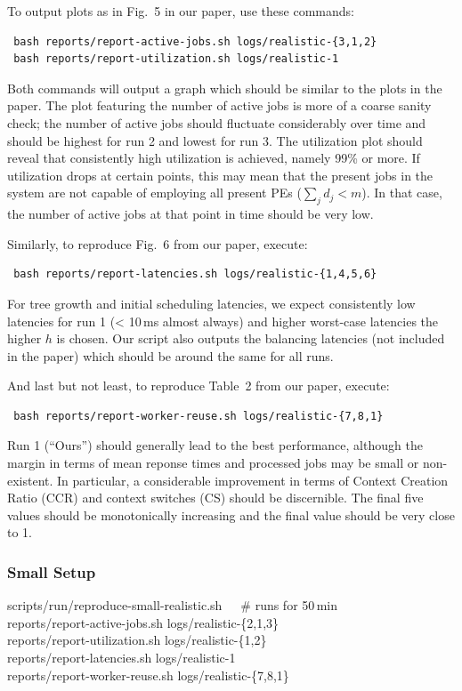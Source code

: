 \documentclass[runningheads]{article}
\numberwithin{dummy}{subsection}
\begin{document}
To output plots as in Fig.~5 in our paper, use these commands:
\begin{verbatim}
 bash reports/report-active-jobs.sh logs/realistic-{3,1,2}
 bash reports/report-utilization.sh logs/realistic-1
\end{verbatim}
Both commands will output a graph which should be similar to the plots in the paper.
The plot featuring the number of active jobs is more of a coarse sanity check; the number of active jobs should fluctuate considerably over time and should be highest for run 2 and lowest for run 3.
The utilization plot should reveal that consistently high utilization is achieved, namely 99\% or more.
If utilization drops at certain points, this may mean that the present jobs in the system are not capable of employing all present PEs ($\sum_j d_j < m$).
In that case, the number of active jobs at that point in time should be very low.

Similarly, to reproduce Fig.~6 from our paper, execute:
\begin{verbatim}
 bash reports/report-latencies.sh logs/realistic-{1,4,5,6}
\end{verbatim}
For tree growth and initial scheduling latencies, we expect consistently low latencies for run 1 (< 10\,ms almost always) and higher worst-case latencies the higher $h$ is chosen.
Our script also outputs the balancing latencies (not included in the paper) which should be around the same for all runs.

And last but not least, to reproduce Table~2 from our paper, execute:
\begin{verbatim}
 bash reports/report-worker-reuse.sh logs/realistic-{7,8,1}
\end{verbatim}
Run 1 (``Ours'') should generally lead to the best performance, although the margin in terms of mean reponse times and processed jobs may be small or non-existent.
In particular, a considerable improvement in terms of Context Creation Ratio (CCR) and context switches (CS) should be discernible.
The final five values should be monotonically increasing and the final value should be very close to 1.

\subsubsection{Small Setup}

\begin{tcolorbox}[
  colback=Magenta!5!white,
  colframe=Magenta!75!black,
  title={\centering In a Nutshell: Commands for Small Setup (Section~\ref{sec:small-setup})}]
\begin{ttfenvcompact}
scripts/run/reproduce-small-realistic.sh\ \ \ \# runs for 50\,min\\
reports/report-active-jobs.sh logs/realistic-\{2,1,3\}\\
reports/report-utilization.sh logs/realistic-\{1,2\}\\
reports/report-latencies.sh logs/realistic-1\\
reports/report-worker-reuse.sh logs/realistic-\{7,8,1\}
\end{ttfenvcompact}
\end{tcolorbox}
\end{document}
